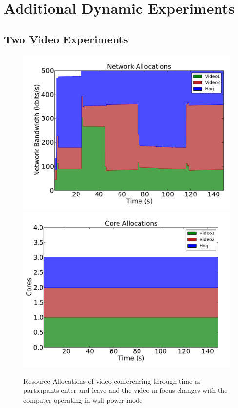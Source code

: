\section{Additional Dynamic Experiments}\label{appendix-dynamic}

\subsection*{Two Video Experiments}
\begin{figure}[!t]
	\begin{center}	
		\includegraphics[bb=0 0 576 432,width=.45\textwidth]{dyn-alloc-wp-ns-2vid.pdf}
		\includegraphics[bb=0 0 576 432,width=.45\textwidth]{dyn-alloc-wp-core-2vid.pdf}
		\caption{ Resource Allocations of video conferencing through time as participants enter and leave and the video in focus changes with the computer operating in wall power mode}
		\label{video_experiment_wp_2vid}
	\end{center}
\end{figure}

